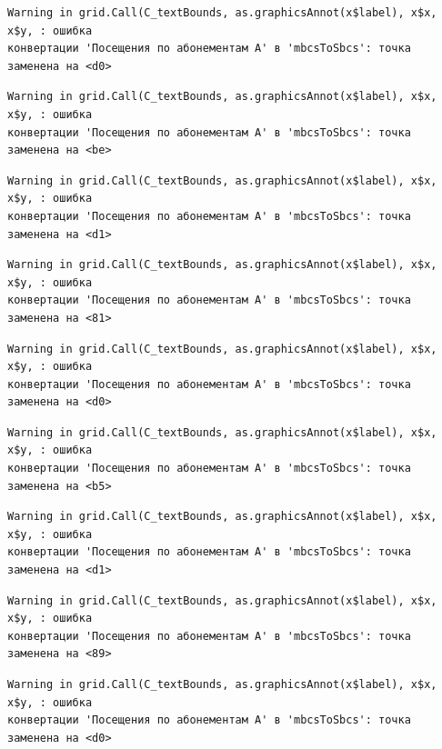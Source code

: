 \documentclass[
  letterpaper,
  DIV=11,
  numbers=noendperiod]{scrreprt}
\begin{document}
\begin{verbatim}
Warning in grid.Call(C_textBounds, as.graphicsAnnot(x$label), x$x, x$y, : ошибка
конвертации 'Посещения по абонементам А' в 'mbcsToSbcs': точка заменена на <d0>
\end{verbatim}

\begin{verbatim}
Warning in grid.Call(C_textBounds, as.graphicsAnnot(x$label), x$x, x$y, : ошибка
конвертации 'Посещения по абонементам А' в 'mbcsToSbcs': точка заменена на <be>
\end{verbatim}

\begin{verbatim}
Warning in grid.Call(C_textBounds, as.graphicsAnnot(x$label), x$x, x$y, : ошибка
конвертации 'Посещения по абонементам А' в 'mbcsToSbcs': точка заменена на <d1>
\end{verbatim}

\begin{verbatim}
Warning in grid.Call(C_textBounds, as.graphicsAnnot(x$label), x$x, x$y, : ошибка
конвертации 'Посещения по абонементам А' в 'mbcsToSbcs': точка заменена на <81>
\end{verbatim}

\begin{verbatim}
Warning in grid.Call(C_textBounds, as.graphicsAnnot(x$label), x$x, x$y, : ошибка
конвертации 'Посещения по абонементам А' в 'mbcsToSbcs': точка заменена на <d0>
\end{verbatim}

\begin{verbatim}
Warning in grid.Call(C_textBounds, as.graphicsAnnot(x$label), x$x, x$y, : ошибка
конвертации 'Посещения по абонементам А' в 'mbcsToSbcs': точка заменена на <b5>
\end{verbatim}

\begin{verbatim}
Warning in grid.Call(C_textBounds, as.graphicsAnnot(x$label), x$x, x$y, : ошибка
конвертации 'Посещения по абонементам А' в 'mbcsToSbcs': точка заменена на <d1>
\end{verbatim}

\begin{verbatim}
Warning in grid.Call(C_textBounds, as.graphicsAnnot(x$label), x$x, x$y, : ошибка
конвертации 'Посещения по абонементам А' в 'mbcsToSbcs': точка заменена на <89>
\end{verbatim}

\begin{verbatim}
Warning in grid.Call(C_textBounds, as.graphicsAnnot(x$label), x$x, x$y, : ошибка
конвертации 'Посещения по абонементам А' в 'mbcsToSbcs': точка заменена на <d0>
\end{verbatim}
\end{document}
